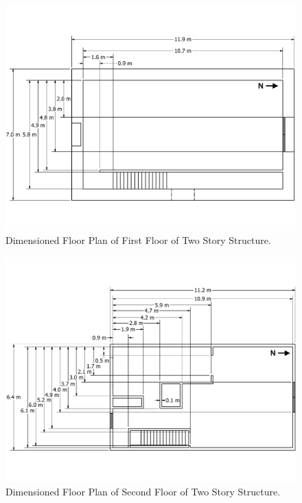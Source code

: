 \documentclass[12pt,oneside]{book}
\begin{document}
\begin{figure}[!ht]
	\includegraphics[width=\columnwidth]{../../DelCo_2014_2015/Drawings/PDFs/CAFS/West_Structure_1st_Floor_Plain}
	\caption{Dimensioned Floor Plan of First Floor of Two Story Structure.}
	\label{fig:dimensioned_first_2story}
\end{figure}


\begin{figure}[!ht]
	\includegraphics[width=\columnwidth]{../../DelCo_2014_2015/Drawings/PDFs/CAFS/West_Structure_2nd_Floor_Plain}
	\caption{Dimensioned Floor Plan of Second Floor of Two Story Structure.}
	\label{fig:dimensioned_second_2story}
\end{figure}
\end{document}
